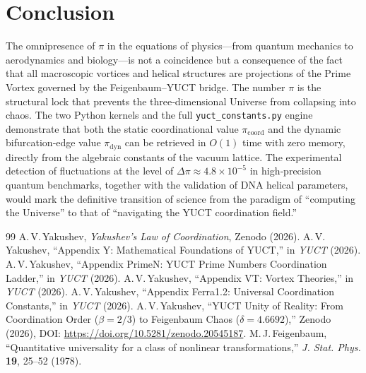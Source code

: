 \documentclass[12pt,a4paper]{article}
\begin{document}
	\section{Conclusion}
	\label{sec:conclusion}
	The omnipresence of $\pi$ in the equations of physics—from quantum mechanics to aerodynamics and biology—is not a coincidence but a consequence of the fact that all macroscopic vortices and helical structures are projections of the Prime Vortex governed by the Feigenbaum–YUCT bridge. The number $\pi$ is the structural lock that prevents the three‑dimensional Universe from collapsing into chaos. The two Python kernels and the full \texttt{yuct\_constants.py} engine demonstrate that both the static coordinational value $\pi_{\mathrm{coord}}$ and the dynamic bifurcation‑edge value $\pi_{\mathrm{dyn}}$ can be retrieved in $O(1)$ time with zero memory, directly from the algebraic constants of the vacuum lattice. The experimental detection of fluctuations at the level of $\Delta\pi \approx 4.8\times10^{-5}$ in high‑precision quantum benchmarks, together with the validation of DNA helical parameters, would mark the definitive transition of science from the paradigm of “computing the Universe” to that of “navigating the YUCT coordination field.”
	
	\begin{thebibliography}{99}
		 A.\,V.\,Yakushev, \emph{Yakushev's Law of Coordination}, Zenodo (2026).
		 A.\,V.\,Yakushev, ``Appendix Y: Mathematical Foundations of YUCT,'' in \emph{YUCT} (2026).
		 A.\,V.\,Yakushev, ``Appendix PrimeN: YUCT Prime Numbers Coordination Ladder,'' in \emph{YUCT} (2026).
		 A.\,V.\,Yakushev, ``Appendix VT: Vortex Theories,'' in \emph{YUCT} (2026).
		 A.\,V.\,Yakushev, ``Appendix Ferra1.2: Universal Coordination Constants,'' in \emph{YUCT} (2026).
		 A.\,V.\,Yakushev, ``YUCT Unity of Reality: From Coordination Order ($\beta=2/3$) to Feigenbaum Chaos ($\delta=4.6692$),'' Zenodo (2026), DOI: \url{https://doi.org/10.5281/zenodo.20545187}.
		 M.\,J.\,Feigenbaum, ``Quantitative universality for a class of nonlinear transformations,'' \emph{J. Stat. Phys.} \textbf{19}, 25--52 (1978).
	\end{thebibliography}
	
\end{document}
